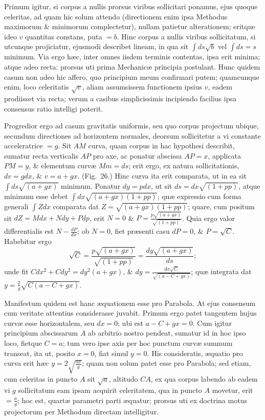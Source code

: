 Primum igitur, si corpus a nullis prorsus viribus sollicitari ponamus, ejus quoque celeritas, ad quam hic solum attendo (directionem enim ipsa Methodus maximorum \& minimorum complectetur), nullam patietur alterationem; eritque ideo $v$ quantitas constans, puta $=b$. Hinc corpus a nullis viribus sollicitatum, si utcunque projiciatur, ejusmodi describet lineam, in qua sit $\int ds\sqrt b$ vel $\int ds=s$ minimum. Via ergo hæc, inter omnes iisdem terminis contentas, ipsa erit minima; atque adeo recta: prorsus uti prima Mechanicæ principia postulant. Hunc quidem casum non adeo hic affero, quo principium meum confirmari putem; quamcunque enim, loco celeritatis $\sqrt v$, aliam assumsissem functionem ipsius $v$, eadem prodiisset via recta; verum a casibus simplicissimis incipiendo facilius ipsa consensus ratio intelligi poterit.

Progredior ergo ad casum gravitatis uniformis, seu quo corpus projectum ubique, secundum directiones ad horizontem normales, deorsum sollicitetur a vi constante acceleratrice $=g$. Sit $AM$ curva, quam corpus in hac hypothesi describit, sumatur recta verticalis $AP$ pro axe, ac ponatur abscissa $AP=x$, applicata $PM=y$, \& elementum curvæ $Mm=ds$; erit ergo, ex natura sollicitationis, $dv=gdx$, \& $v=a+gx$. (Fig.~26.) Hinc curva ita erit comparata, ut in ea sit $\int ds\sqrt{(a+gx)}$ minimum. Ponatur $dy=pdx$, ut sit $ds=dx\sqrt{(1+pp)}$, atque minimum esse debet $\int dx\sqrt{(a+gx)(1+pp)}$; quæ expressio cum forma generali $\int Zdx$ comparata dat $Z=\sqrt{(a+gx)(1+pp)}$; quare, cum positum sit $dZ=Mdx+Ndy+Pdp$, erit $N=0$ \& $P=\frac{p\sqrt{(a+gx)}}{\sqrt{(1+pp)}}$. Quia ergo valor differentialis est $N-\frac{dP}{dx}$; ob $N=0$, fiet præsenti casu $dP=0$, \& $P=\sqrt C$. Habebitur ergo
\[\sqrt C=\frac{p\sqrt{(a+gx)}}{\sqrt{(1+pp)}}=\frac{dy\sqrt{(a+gx)}}{ds};\]
unde fit $Cdx^2+Cdy^2=dy^2(a+gx)$, \& $dy=\frac{dx\sqrt C}{\sqrt{(a-C+gx)}}$; quæ integrata dat $y=\frac2g\sqrt{C(a-C+gx)}$.

Manifestum quidem est hanc æquationem esse pro Parabola. At ejus consensum cum veritate attentius considerasse juvabit. Primum ergo patet tangentem hujus curvæ esse horizontalem, seu $dx=0$; ubi est $a-C+gx=0$. Cum igitur principium abscissarum $A$ ab arbitrio nostro pendeat, sumatur id in hoc ipso loco, fietque $C=a$; tum vero ipse axis per hoc punctum curvæ summum transeat, ita ut, posito $x=0$, fiat simul $y=0$. His consideratis, æquatio pro curva erit hæc $y=2\sqrt{\frac{ax}{g}}$; quam non solum patet esse pro Parabola; sed etiam, cum celeritas in puncto $A$ sit $\sqrt a$, altitudo $CA$, ex qua corpus labendo ab eadem vi $g$ sollicitatum eam ipsam acquirit celeritatem, qua in puncto $A$ movetur, erit $=\frac ag$; hoc est, quartæ parametri parti æquatur; prorsus uti ex doctrina motus projectorum per Methodum directam intelligitur.

